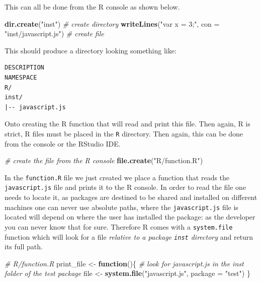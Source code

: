 \documentclass[
]{krantz}
\makeatletter
\newenvironment{Shaded}{\begin{snugshade}}{\end{snugshade}}
\newcommand{\CommentTok}[1]{\textcolor[rgb]{0.37,0.37,0.37}{\textit{#1}}}
\newcommand{\ControlFlowTok}[1]{\textcolor[rgb]{0.27,0.27,0.27}{\textbf{#1}}}
\newcommand{\DataTypeTok}[1]{\textcolor[rgb]{0.27,0.27,0.27}{#1}}
\newcommand{\KeywordTok}[1]{\textcolor[rgb]{0.27,0.27,0.27}{\textbf{#1}}}
\newcommand{\NormalTok}[1]{#1}
\newcommand{\StringTok}[1]{\textcolor[rgb]{0.5,0.5,0.5}{#1}}
\newenvironment{kframe}{%
\medskip{}
\setlength{\fboxsep}{.8em}
 \def\at@end@of@kframe{}%
 \ifinner\ifhmode%
  \def\at@end@of@kframe{\end{minipage}}%
  \begin{minipage}{\columnwidth}%
 \fi\fi%
 \def\FrameCommand##1{\hskip\@totalleftmargin \hskip-\fboxsep
 \colorbox{shadecolor}{##1}\hskip-\fboxsep
     \hskip-\linewidth \hskip-\@totalleftmargin \hskip\columnwidth}%
 \MakeFramed {\advance\hsize-\width
   \@totalleftmargin\z@ \linewidth\hsize
   \@setminipage}}%
 {\par\unskip\endMakeFramed%
 \at@end@of@kframe}
\renewenvironment{Shaded}{\begin{kframe}}{\end{kframe}}
\makeatother
\begin{document}
This can all be done from the R console as shown below.

\begin{Shaded}
\begin{Highlighting}[]
\KeywordTok{dir.create}\NormalTok{(}\StringTok{"inst"}\NormalTok{) }\CommentTok{\# create directory}
\KeywordTok{writeLines}\NormalTok{(}\StringTok{"var x = 3;"}\NormalTok{, }\DataTypeTok{con =} \StringTok{"inst/javascript.js"}\NormalTok{) }\CommentTok{\# create file}
\end{Highlighting}
\end{Shaded}

This should produce a directory looking something like:

\begin{verbatim}
DESCRIPTION
NAMESPACE
R/
inst/
|-- javascript.js
\end{verbatim}

Onto creating the R function that will read and print this file. Then again, R is strict, R files must be placed in the \texttt{R} directory. Then again, this can be done from the console or the RStudio IDE.

\begin{Shaded}
\begin{Highlighting}[]
\CommentTok{\# create the file from the R console}
\KeywordTok{file.create}\NormalTok{(}\StringTok{"R/function.R"}\NormalTok{)}
\end{Highlighting}
\end{Shaded}

In the \texttt{function.R} file we just created we place a function that reads the \texttt{javascript.js} file and prints it to the R console. In order to read the file one needs to locate it, as packages are destined to be shared and installed on different machines one can never use absolute paths, where the \texttt{javascript.js} file is located will depend on where the user has installed the package: as the developer you can never know that for sure. Therefore R comes with a \texttt{system.file} function which will look for a file \emph{relative to a package \texttt{inst} directory} and return its full path.

\begin{Shaded}
\begin{Highlighting}[]
\CommentTok{\# R/function.R}
\NormalTok{print\_file <{-}}\StringTok{ }\ControlFlowTok{function}\NormalTok{()\{}
  \CommentTok{\# look for javascript.js in the inst folder of the test package}
\NormalTok{  file <{-}}\StringTok{ }\KeywordTok{system.file}\NormalTok{(}\StringTok{"javascript.js"}\NormalTok{, }\DataTypeTok{package =} \StringTok{"test"}\NormalTok{)}
\NormalTok{\}}
\end{Highlighting}
\end{Shaded}
\end{document}
